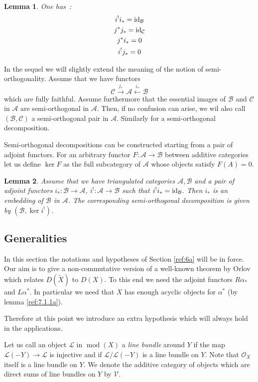 \documentclass{amsproc}
\def\Ascr{{\mathcal A}}
\def\Bscr{{\mathcal B}}
\def\Cscr{{\mathcal C}}
\def\Lscr{{\mathcal L}}
\def\Oscr{{\mathcal O}}
\def\Vscr{{\mathcal V}}
\def\Id{\text{id}}
\def\ker{\operatorname {ker}}
\def\coh{\operatorname {mod}}
\def\r{\rightarrow}
\let\oldtext\text
\def\text#1{\oldtext{\upshape #1}}
\newtheorem{lemmas}{Lemma}[subsection]
\theoremstyle{definition}
\theoremstyle{remark}
\numberwithin{equation}{section}
\numberwithin{table}{section}
\numberwithin{figure}{section}
\begin{document}
\begin{lemmas} One has~:
\begin{gather*}
 i^! i_\ast=\Id_\Bscr
\\
j^\ast j_\ast=\Id_\Cscr\\
j^\ast i_\ast=0\\
i^! j_\ast=0\\
\end{gather*}
\end{lemmas}  
In the sequel we will slightly extend the meaning of the notion of
semi-orthogonality. Assume that we have functors
\[
\Cscr\xrightarrow{j_\ast} \Ascr \xleftarrow{i_\ast} \Bscr
\]
which are fully faithful. Assume  furthermore that the essential images of
$\Bscr$ and $\Cscr$ in $\Ascr$ are  semi-orthogonal in
$\Ascr$. Then, if no confusion can arise, we wil also call $(\Bscr,\Cscr)$
a semi-orthogonal pair in $\Ascr$. Similarly for a semi-orthogonal
decomposition.  


Semi-orthogonal decompositions can be constructed starting from a pair
of adjoint functors. For an arbitrary functor $F:\Ascr\r \Bscr$
between additive categories let us define $\ker F$ as the full subcategory
of $\Ascr$ whose objects satisfy $F(A)=0$.
\begin{lemmas}
\label{ref:8.1.4a}
 Assume that we have triangulated categories
  $\Ascr,\Bscr$ and a pair of adjoint functors $i_\ast:\Bscr\r \Ascr$,
  $i^!:\Ascr\r \Bscr$ such that $i^! i_\ast=\Id_\Bscr$. Then
  $i_\ast$ is an embedding of $\Bscr$ in $\Ascr$. The
  corresponding semi-orthogonal decomposition is given by 
$(\Bscr,\ker i^!)$.
\end{lemmas}

\subsection{Generalities}
\label{ref:8.2a}
In this section the notations and hypotheses of Section
\ref{ref:6a} will be in force. Our aim  is to give
a non-commutative version of a well-known theorem by Orlov
\cite{Orlov} which relates $D(\tilde{X})$ to $D(X)$.  To this end we
need the adjoint functors $R\alpha_\ast$ and $L\alpha^\ast$. In
particular we need that $X$ has enough acyclic objects for
$\alpha^\ast$ (by lemma \ref{ref:7.1.1a}).


Therefore  at this point we introduce an extra hypothesis
which will always hold in the applications. 

Let us call an object $\Lscr$ in $\coh(X)$ a \emph{line bundle} around
$Y$ if the map $\Lscr(-Y)\r \Lscr$ is injective and if
$\Lscr/\Lscr(-Y)$ is a line bundle on $Y$. Note that $\Oscr_X$ itself
is a line bundle on $Y$. We denote the additive category of objects
which are direct sums of line bundles on $Y$ by $\Vscr$.
\end{document}
